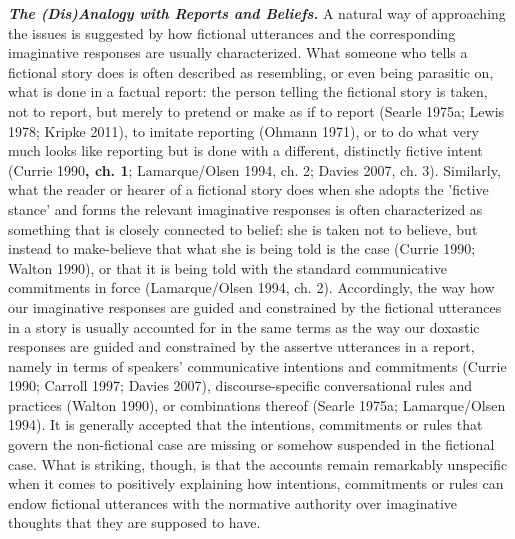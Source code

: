 \vspace{.2cm}
\noindent\textbf{\emph{The (Dis)Analogy with Reports and Beliefs.}} A natural way of approaching the issues is suggested by how fictional utterances and the corresponding imaginative responses are usually characterized. What someone who tells a fictional story does is often described as resembling, or even being parasitic on, what is done in a factual report: the person telling the fictional story is taken, not to report, but merely to pretend or make as if to report (Searle 1975a; Lewis 1978; Kripke 2011), to imitate reporting (Ohmann 1971), or to do what very much looks like reporting but is done with a different, distinctly fictive intent (Currie 1990\textbf{, ch. 1}; Lamarque/Olsen 1994, ch. 2; Davies 2007, ch. 3). Similarly, what the reader or hearer of a fictional story does when she adopts the 'fictive stance' and forms the relevant imaginative responses is often characterized as something that is closely connected to belief: she is taken not to believe, but instead to make-believe that what she is being told is the case (Currie 1990; Walton 1990), or that it is being told with the standard communicative commitments in force (Lamarque/Olsen 1994, ch. 2). Accordingly, the way how our imaginative responses are guided and constrained by the fictional utterances in a story is usually accounted for in the same terms as the way our doxastic responses are guided and constrained by the assertve utterances in a report, namely in terms of speakers' communicative intentions and commitments (Currie 1990; Carroll 1997; Davies 2007), discourse-specific conversational rules and practices (Walton 1990), or combinations thereof (Searle 1975a; Lamarque/Olsen 1994). It is generally accepted that the intentions, commitments or rules that govern the non-fictional case are missing or somehow suspended in the fictional case. What is striking, though, is that the accounts remain remarkably unspecific when it comes to positively explaining how intentions, commitments or rules can endow fictional utterances with the normative authority over imaginative thoughts that they are supposed to have.


